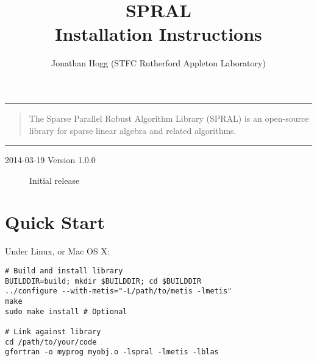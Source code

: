 \documentclass{spral}
\newcommand{\purpose}{
The Sparse Parallel Robust Algorithm Library (SPRAL) is an open-source library
for sparse linear algebra and related algorithms.
}
\begin{document}
\title{SPRAL \\Installation Instructions}
\author{Jonathan Hogg (STFC Rutherford Appleton Laboratory)}
\makeatletter
{}
\hfill
{\Huge \bfseries \textcolor{stfcblue}{\libraryname}}
\vspace{0.1cm}
\textcolor{stfcgrey}{\hrule}
\vspace{0.5cm}

\begin{center}
   \LARGE \bfseries
   \@title
\end{center}
\begin{quote}
   \large
   \purpose
\end{quote}

\begin{flushright}
\noindent
\@author
\end{flushright}
\vspace{-0.2cm}
\textcolor{stfcgrey}{\hrule}
\makeatother
\thispagestyle{firststyle}

\versionhistory
\begin{description}
\item[2014-03-19 Version 1.0.0] Initial release
\end{description}


\section{Quick Start}

Under Linux, or Mac OS X:

\begin{verbatim}
# Build and install library
BUILDDIR=build; mkdir $BUILDDIR; cd $BUILDDIR
../configure --with-metis="-L/path/to/metis -lmetis"
make
sudo make install # Optional

# Link against library
cd /path/to/your/code
gfortran -o myprog myobj.o -lspral -lmetis -lblas
\end{verbatim}
\end{document}
